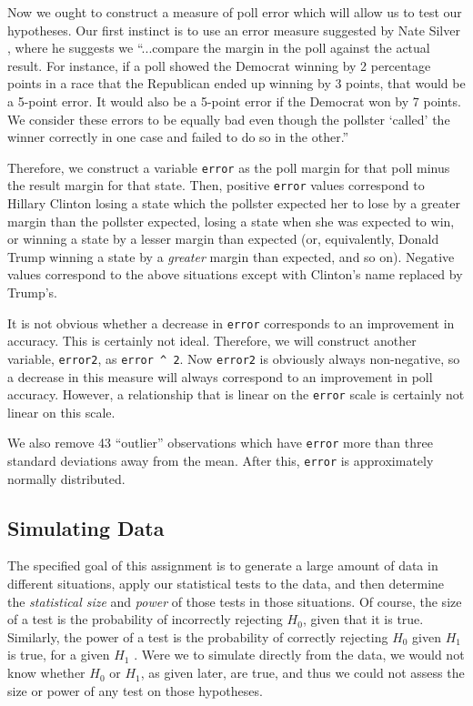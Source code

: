 \documentclass[11pt, oneside]{article}
\newcommand \Rcode[1]{{\texttt{\colorbox{codegray}{#1}}}}
\begin{document}
Now we ought to construct a measure of poll error which will allow us to test our hypotheses. Our first instinct is to use an error measure suggested by Nate Silver \cite{silver}, where he suggests we ``...compare the margin in the poll against the actual result. For instance, if a poll showed the Democrat winning by 2 percentage points in a race that the Republican ended up winning by 3 points, that would be a 5-point error. It would also be a 5-point error if the Democrat won by 7 points. We consider these errors to be equally bad even though the pollster `called' the winner correctly in one case and failed to do so in the other.''

Therefore, we construct a variable \Rcode{error} as the poll margin for that poll minus the result margin for that state. Then, positive \Rcode{error} values correspond to Hillary Clinton losing a state which the pollster expected her to lose by a greater margin than the pollster expected, losing a state when she was expected to win, or winning a state by a lesser margin than expected (or, equivalently, Donald Trump winning a state by a \emph{greater} margin than expected, and so on). Negative values correspond to the above situations except with Clinton's name replaced by Trump's. 

It is not obvious whether a decrease in \Rcode{error} corresponds to an improvement in accuracy. This is certainly not ideal. Therefore, we will construct another variable, \Rcode{error2}, as \Rcode{error \^{} 2}. Now \Rcode{error2} is obviously always non-negative, so a decrease in this measure will always correspond to an improvement in poll accuracy. However, a relationship that is linear on the \Rcode{error} scale is certainly not linear on this scale. 

We also remove 43 ``outlier'' observations which have \Rcode{error} more than three standard deviations away from the mean. After this, \Rcode{error} is approximately normally distributed. 

\subsection{Simulating Data}

The specified goal of this assignment is to generate a large amount of data in different situations, apply our statistical tests to the data, and then determine the \emph{statistical size} and \emph{power} of those tests in those situations. Of course, the size of a test is the probability of incorrectly rejecting $H_0$, given that it is true. Similarly, the power of a test is the probability of correctly rejecting $H_0$ given $H_1$ is true, for a given $H_1$ \cite{spec}. Were we to simulate directly from the data, we would not know whether $H_0$ or $H_1$, as given later, are true, and thus we could not assess the size or power of any test on those hypotheses. 
\end{document}
